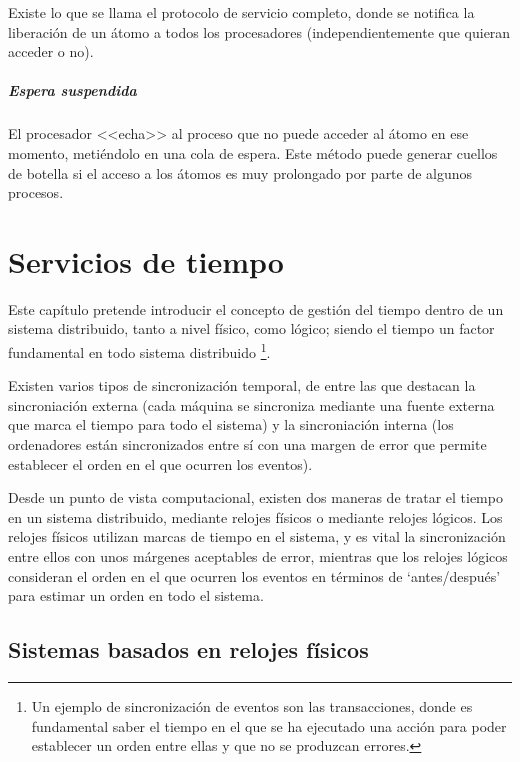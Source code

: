 \documentclass[a4paper, 11pt, titlepage]{article}
\begin{document}
                        Existe lo que se llama el protocolo de servicio completo, donde se notifica 
                        la liberación de un átomo a todos los procesadores (independientemente que 
                        quieran acceder o no).

                    \subparagraph{Espera suspendida}

                        El procesador <<echa>> al proceso que no puede acceder al átomo en ese momento, 
                        metiéndolo en una cola de espera. Este método puede generar cuellos de botella 
                        si el acceso a los átomos es muy prolongado por parte de algunos procesos.

\section{Servicios de tiempo}

    Este capítulo pretende introducir el concepto de gestión del tiempo dentro de un sistema distribuido, 
    tanto a nivel físico, como lógico; siendo el tiempo un factor fundamental en todo sistema distribuido
    \footnote{
        Un ejemplo de sincronización de eventos son las transacciones, donde es fundamental saber el 
        tiempo en el que se ha ejecutado una acción para poder establecer un orden entre ellas y que no 
        se produzcan errores. 
    }.

    Existen varios tipos de sincronización temporal, de entre las que destacan la sincroniación externa 
    (cada máquina se sincroniza mediante una fuente externa que marca el tiempo para todo el sistema) y 
    la sincroniación interna (los ordenadores están sincronizados entre sí con una margen de error que 
    permite establecer el orden en el que ocurren los eventos).

    Desde un punto de vista computacional, existen dos maneras de tratar el tiempo en un sistema 
    distribuido, mediante relojes físicos o mediante relojes lógicos. Los relojes físicos utilizan 
    marcas de tiempo en el sistema, y es vital la sincronización entre ellos con unos márgenes 
    aceptables de error, mientras que los relojes lógicos consideran el orden en el que ocurren los 
    eventos en términos de ‘antes/después’ para estimar un orden en todo el sistema.

    \subsection{Sistemas basados en relojes físicos}
\end{document}
